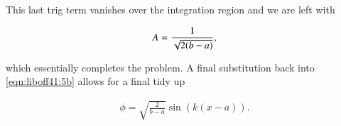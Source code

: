 This last trig term vanishes over the integration region and we are left with 

\begin{align}\label{eqn:liboff41:6}
A = \frac{1}{ \sqrt{2 (b-a)}},
\end{align}

which essentially completes the problem.  A final substitution back into \ref{eqn:liboff41:5b} allows for a final tidy up

\begin{align}\label{eqn:liboff41:5c}
\phi = \sqrt{\frac{2}{b-a}} \sin( k (x-a )).
\end{align}

\EndArticle
